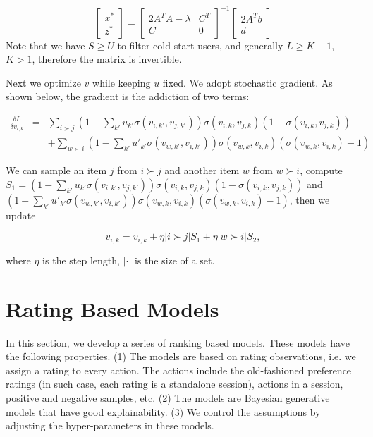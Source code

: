 \documentclass[11pt]{report}
\begin{document}
\begin{equation}
\begin{bmatrix}
x^* \\
z^*
\end{bmatrix} = \begin{bmatrix}
2A^TA-\lambda & C^T \\
C & 0
\end{bmatrix}^{-1}
\begin{bmatrix}
2A^Tb \\
d
\end{bmatrix}
\end{equation}
Note that we have $S\geq U$ to filter cold start users, and generally $L\geq K-1$, $K>1$, therefore the matrix is invertible. 

Next we optimize $v$ while keeping $u$ fixed. We adopt stochastic gradient.  As shown below, the gradient is the addiction of two terms:

\begin{eqnarray*}
\frac{\delta L}{\delta v_{i,k}}&=&\sum_{i\succ j} (1-\sum_{k'} u_{k'}\sigma(v_{i,k'},v_{j,k'}))\sigma(v_{i,k},v_{j,k})(1-\sigma(v_{i,k},v_{j,k}))\\
&&+ \sum_{w\succ i} (1-\sum_{k'} u'_{k'}\sigma(v_{w,k'},v_{i,k'}))\sigma(v_{w,k},v_{i,k})(\sigma(v_{w,k},v_{i,k})-1)
\end{eqnarray*}

We can sample an item $j$ from $i\succ j$ and another item $w$ from $w\succ i$,  compute $S_1= (1-\sum_{k'} u_{k'}\sigma(v_{i,k'},v_{j,k'}))\sigma(v_{i,k},v_{j,k})(1-\sigma(v_{i,k},v_{j,k}))$ and $(1-\sum_{k'} u'_{k'}\sigma(v_{w,k'},v_{i,k'}))\sigma(v_{w,k},v_{i,k})(\sigma(v_{w,k},v_{i,k})-1)$, then we update 

\begin{equation}
v_{i,k}=v_{i,k}+\eta |i\succ j| S_1 +\eta |w\succ i| S_2,
\end{equation}

where $\eta$ is the step length, $|\cdot|$ is the size of a set.
 
\part{Rating Based Models}
In this section, we develop a series of ranking based models. These models have the following properties. (1) The models are based on rating observations, i.e. we assign a rating to every action. The actions include the old-fashioned preference ratings (in such case, each rating is a standalone session), actions in a session, positive and negative samples, etc. (2) The models are Bayesian generative models that have good explainability. (3) We control the assumptions by adjusting the hyper-parameters in these models.
   
\end{document}
